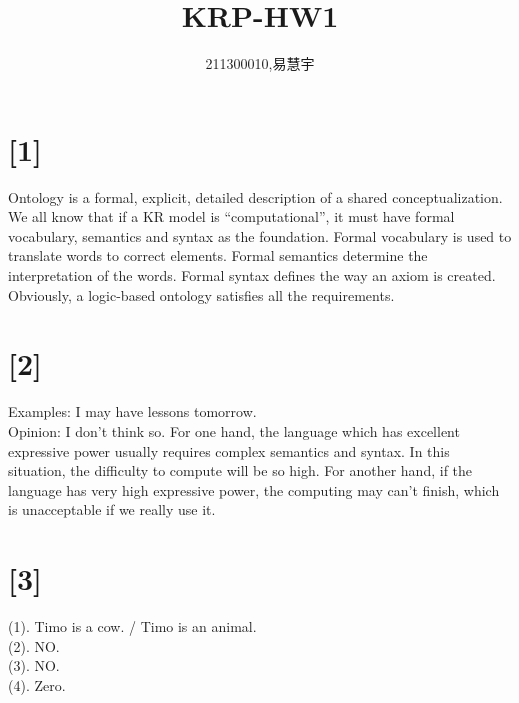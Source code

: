 \documentclass[a4paper,UTF8]{article}
\begin{document}
\title{KRP-HW1}
\author{211300010,易慧宇}
\date{}
\maketitle
\section*{[1]}
Ontology is a formal, explicit, detailed description of a shared conceptualization. We all know that if a KR model is “computational”, it must have formal vocabulary, semantics and syntax as the foundation. Formal vocabulary is used to translate words to correct elements. Formal semantics determine the interpretation of the words. Formal syntax defines the way an axiom is created. Obviously, a logic-based ontology satisfies all the requirements.
\section*{[2]}
Examples: I may have lessons tomorrow.\\
Opinion: I don’t think so.
For one hand, the language which has excellent expressive power usually requires complex semantics and syntax. In this situation, the difficulty to compute will be so high. For another hand, if the language has very high expressive power, the computing may can’t finish, which is unacceptable if we really use it.
\section*{[3]}
(1). Timo is a cow. / Timo is an animal.\\
(2). NO.\\
(3). NO.\\
(4). Zero.\\
\end{document}
